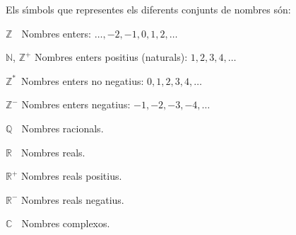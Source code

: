 \pagebreak

Els s\'{\i}mbols que representes els diferents conjunts de nombres s\'{o}n:

\begin{list}{}
{\setlength{\labelwidth}{15mm} \setlength{\leftmargin}{20mm}
\setlength{\labelsep}{5mm}}
    \item[$\mathbb{Z\phantom{{}^+}}$] Nombres enters: $\ldots,-2,-1,0,1,2,\ldots$
    \item[$\mathbb{N}$, $\mathbb{Z}^+$] Nombres enters positius
    (naturals): $1,2,3,4,\ldots$
    \item[$\mathbb{Z}^*\,$] Nombres enters no negatius: $0,1,2,3,4,\ldots$
    \item[$\mathbb{Z}^-$] Nombres enters negatius: $-1,-2,-3,-4,\ldots$
    \item[$\mathbb{Q\phantom{{}^+}}$] Nombres racionals.
    \item[$\mathbb{R\phantom{{}^+}}$] Nombres reals.
    \item[$\mathbb{R}^+$] Nombres reals positius.
    \item[$\mathbb{R}^-$] Nombres reals negatius.
    \item[$\mathbb{C\phantom{{}^+}}$] Nombres complexos.
\end{list}
 
 
 
 
 
